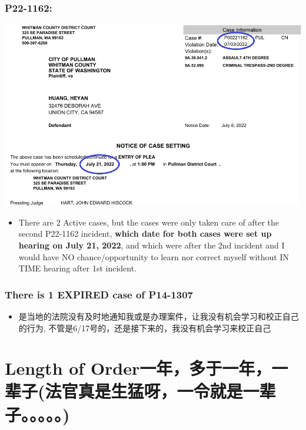 \documentclass[9pt, b5paper]{article}
\begin{document}
\subsubsection{\textbf{P22-1162:}}
\label{sec-1-1-2}

\includegraphics[width=.9\linewidth]{./pic/dearCousin_20220919_185057.png}
\begin{itemize}
\item There are 2 Active cases, but the cases were only taken care of after the second P22-1162 incident, \textbf{which date for both cases were set up hearing on July 21, 2022}, and which were after the 2nd incident and I would have NO chance/opportunity to learn nor correct myself without IN TIME hearing after 1st incident.
\end{itemize}
\subsubsection{There is 1 EXPIRED case of \textbf{P14-1307}}
\label{sec-1-1-3}
\begin{itemize}
\item 是当地的法院没有及时地通知我或是办理案件，让我没有机会学习和校正自己的行为, 不管是6/17号的，还是接下来的，我没有机会学习来校正自己
\end{itemize}

\section{Length of Order一年，多于一年，一辈子(法官真是生猛呀，一令就是一辈子。。。。。)}
\label{sec-2}
\end{document}
